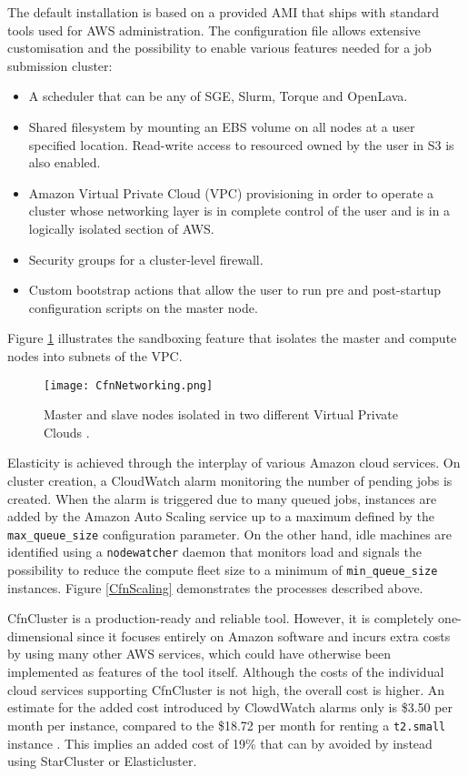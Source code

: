 The default installation is based on a provided AMI that ships with standard tools used for AWS administration. The configuration file allows extensive customisation and the possibility to enable various features needed for a job submission cluster:
\begin{itemize}
	\item A scheduler that can be any of SGE, Slurm, Torque and OpenLava\cite{OpenLava}.
	\item Shared filesystem by mounting an EBS volume on all nodes at a user specified location. Read-write access to resourced owned by the user in S3 is also enabled.
	\item Amazon Virtual Private Cloud (VPC) provisioning in order to operate a cluster whose networking layer is in complete control of the user and is in a logically isolated section of AWS.
	\item Security groups for a cluster-level firewall.
	\item Custom bootstrap actions that allow the user to run pre and post-startup configuration scripts on the master node.
\end{itemize}

Figure \ref{CfnNetworking} illustrates the sandboxing feature that isolates the master and compute nodes into subnets of the VPC.

\begin{figure}[H]
	\centering
		\texttt{[image: CfnNetworking.png]}
	\caption{Master and slave nodes isolated in two different Virtual Private Clouds \cite{CfnVPC}.}
	\label{CfnNetworking}
\end{figure}

Elasticity is achieved through the interplay of various Amazon cloud services. On cluster creation, a CloudWatch alarm monitoring the number of pending jobs is created. When the alarm is triggered due to many queued jobs, instances are added by the Amazon Auto Scaling service up to a maximum defined by the \verb|max_queue_size| configuration parameter. On the other hand, idle machines are identified using a \verb|nodewatcher| daemon that monitors load and signals the possibility to reduce the compute fleet size to a minimum of \verb|min_queue_size| instances. Figure \ref{CfnScaling} demonstrates the processes described above.

CfnCluster is a production-ready and reliable tool. However, it is completely one-dimensional since it focuses entirely on Amazon software and incurs extra costs by using many other AWS services, which could have otherwise been implemented as features of the tool itself. Although the costs of the individual cloud services supporting CfnCluster is not high, the overall cost is higher. An estimate for the added cost introduced by ClowdWatch alarms only is \$3.50 per month per instance, compared to the \$18.72 per month for renting a \verb|t2.small| instance \cite{AWSPricing}. This implies an added cost of 19\% that can by avoided by instead using StarCluster or Elasticluster.

